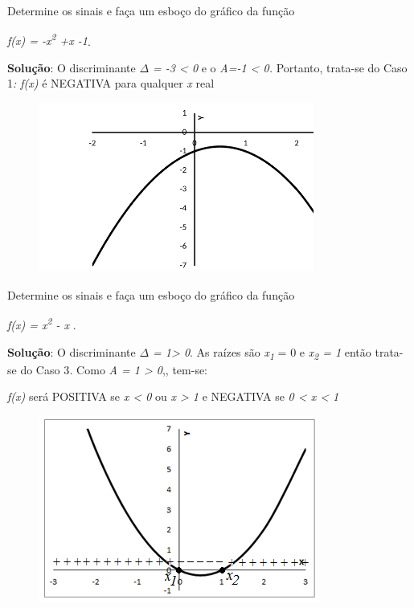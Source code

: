 \begin{texemplo}
Determine os sinais e faça um esboço do gráfico da função

 \textit{f(x) = -x\textsuperscript{2} +x -1}. 

\textbf{Solução}: O discriminante \textit{$ \Delta $  = -3 < 0  }e o\textit{ A=-1 < 0. }Portanto, trata-se do Caso 1\textit{: f(x) }é NEGATIVA para qualquer \textit{x} real\qedsymbol{}

\begin{figure}[H]
	\begin{Center}
		\includegraphics[width=3.55in,height=2.2in]{capitulos/funcao_do_segundo_grau/media/image15.pdf}
	\end{Center}
\end{figure}
\end{texemplo}

\begin{texemplo}
Determine os sinais e faça um esboço do gráfico da função

 \textit{f(x) = x\textsuperscript{2} - x }. 

\textbf{Solução}: O discriminante \textit{$ \Delta $  = 1> 0}. As raízes são   \textit{x\textsubscript{1}} = 0 e \textit{ x\textsubscript{2} = 1} então trata-se do Caso 3\textit{. }Como \textit{A = 1 > 0},, tem-se:

\textit{f(x)} será  POSITIVA se \textit{x < 0}  ou   \textit{x > 1    }e  NEGATIVA    se    \textit{0  <  x  <  1}\qedsymbol{}

\begin{figure}[H]
	\begin{Center}
		\includegraphics[width=3.62in,height=2.41in]{capitulos/funcao_do_segundo_grau/media/image16.png}
	\end{Center}
\end{figure}
\end{texemplo}

